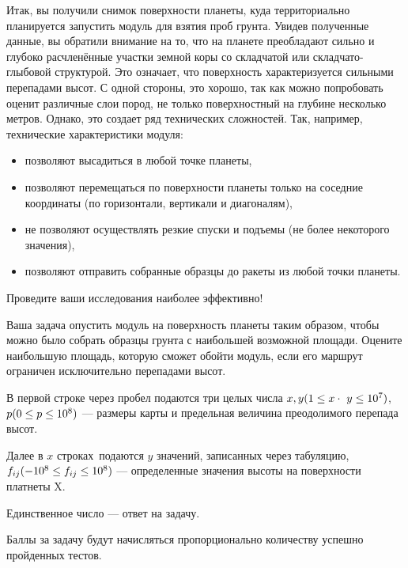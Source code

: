 
Итак, вы получили снимок поверхности планеты, куда территориально планируется запустить модуль для взятия проб грунта. Увидев полученные данные, вы обратили внимание на то, что на планете преобладают сильно и глубоко расчленённые участки земной коры со складчатой или складчато-глыбовой структурой. Это означает, что поверхность характеризуется сильными перепадами высот. С одной стороны, это хорошо, так как можно попробовать оценит различные слои пород, не только поверхностный на глубине несколько метров. Однако, это создает ряд технических сложностей. Так, например, технические характеристики модуля:

\begin{itemize}
    \item позволяют высадиться в любой точке планеты,
    \item позволяют перемещаться по поверхности планеты только на соседние координаты (по горизонтали, вертикали и диагоналям),
    \item не позволяют осуществлять резкие спуски и подъемы (не более некоторого значения),
    \item позволяют отправить собранные образцы до ракеты из любой точки планеты.
\end{itemize}


Проведите ваши исследования наиболее эффективно! 

Ваша задача опустить модуль на поверхность планеты таким образом, чтобы можно было собрать образцы грунта с наибольшей возможной площади. Оцените наибольшую площадь, которую сможет обойти модуль, если его маршрут ограничен исключительно перепадами высот.


В первой строке через пробел подаются три целых числа $x, y \space (1\leq x \cdot y \leq 10^7)$, $p\space (0 \leq p \leq 10^8)$ — размеры карты и предельная величина преодолимого перепада высот.

Далее в $x$ строках подаются $y$ значений, записанных через табуляцию, $f_{ij}\space(-10^8 \leq f_{ij} \leq 10^8)$ — определенные значения высоты на поверхности платнеты X.

\outputfmtSection

Единственное число — ответ на задачу.

\markSection

Баллы за задачу будут начисляться пропорционально количеству успешно пройденных тестов.

